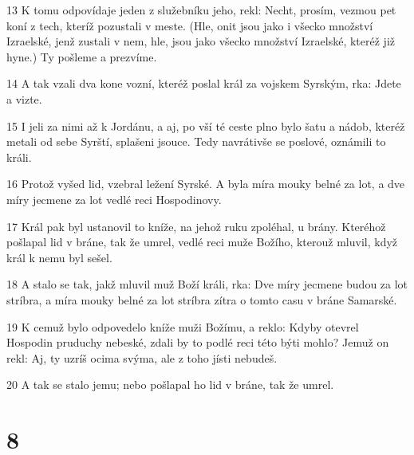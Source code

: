 \par 13 K tomu odpovídaje jeden z služebníku jeho, rekl: Necht, prosím, vezmou pet koní z tech, kteríž pozustali v meste. (Hle, onit jsou jako i všecko množství Izraelské, jenž zustali v nem, hle, jsou jako všecko množství Izraelské, kteréž již hyne.) Ty pošleme a prezvíme.
\par 14 A tak vzali dva kone vozní, kteréž poslal král za vojskem Syrským, rka: Jdete a vizte.
\par 15 I jeli za nimi až k Jordánu, a aj, po vší té ceste plno bylo šatu a nádob, kteréž metali od sebe Syrští, splašeni jsouce. Tedy navrátivše se poslové, oznámili to králi.
\par 16 Protož vyšed lid, vzebral ležení Syrské. A byla míra mouky belné za lot, a dve míry jecmene za lot vedlé reci Hospodinovy.
\par 17 Král pak byl ustanovil to kníže, na jehož ruku zpoléhal, u brány. Kteréhož pošlapal lid v bráne, tak že umrel, vedlé reci muže Božího, kterouž mluvil, když král k nemu byl sešel.
\par 18 A stalo se tak, jakž mluvil muž Boží králi, rka: Dve míry jecmene budou za lot stríbra, a míra mouky belné za lot stríbra zítra o tomto casu v bráne Samarské.
\par 19 K cemuž bylo odpovedelo kníže muži Božímu, a reklo: Kdyby otevrel Hospodin pruduchy nebeské, zdali by to podlé reci této býti mohlo? Jemuž on rekl: Aj, ty uzríš ocima svýma, ale z toho jísti nebudeš.
\par 20 A tak se stalo jemu; nebo pošlapal ho lid v bráne, tak že umrel.

\chapter{8}

